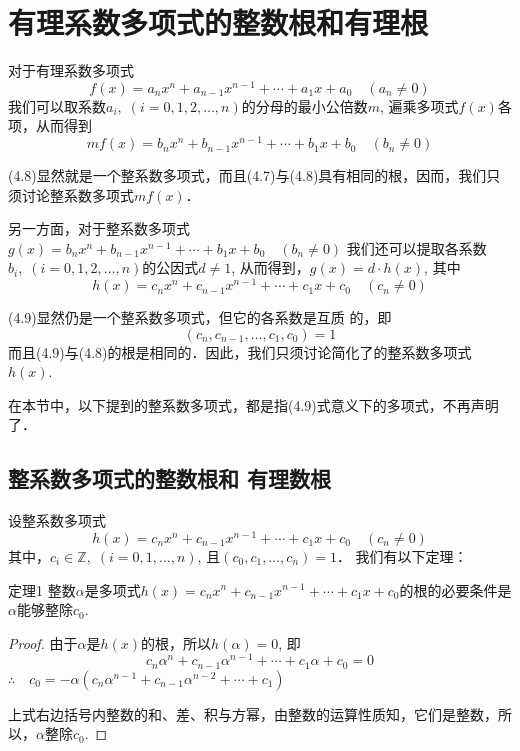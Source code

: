 \section{有理系数多项式的整数根和有理根}
对于有理系数多项式
\begin{equation}
    f(x)=a_nx^n+a_{n-1}x^{n-1}+\cdots+a_1x+a_0\quad (a_n\ne 0)
\end{equation}
我们可以取系数$a_i,\; (i=0, 1, 2,\ldots,n)$的分母的最小公倍数$m$, 遍乘多项式$f(x)$各项，从而得到
\begin{equation}
    mf(x)=b_nx^n+b_{n-1}x^{n-1}+\cdots+b_1x+b_0\quad (b_n\ne 0)
\end{equation}

(4.8)显然就是一个整系数多项式，而且(4.7)与(4.8)具有相同的根，因而，我们只须讨论整系数多项式$mf(x)$．

另一方面，对于整系数多项式$g (x) =b_nx^n+b_{n-1}x^{n-1}+\cdots+b_1x+b_0\quad (b_n\ne 0)$
我们还可以提取各系数$b_i,\; (i=0, 1, 2,\ldots,n)$的公因式$d\ne 1$, 从而得到，$g(x)=d\cdot h(x)$, 其中
\begin{equation}
    h (x) =c_nx^n+c_{n-1}x^{n-1}+\cdots+c_1x+c_0\quad (c_n\ne 0)
\end{equation}

(4.9)显然仍是一个整系数多项式，但它的各系数是互质
的，即$$(c_n,c_{n-1},\ldots,c_1,c_0)=1$$ 而且(4.9)与(4.8)的根是相同的．因此，我们只须讨论简化了的整系数多项式$h(x)$.

在本节中，以下提到的整系数多项式，都是指(4.9)式意义下的多项式，不再声明了．

\subsection{整系数多项式的整数根和 有理数根}

设整系数多项式
\[ h (x) =c_nx^n+c_{n-1}x^{n-1}+\cdots+c_1x+c_0\quad (c_n\ne 0)\]
其中，$c_i\in\mathbb{Z}, \;(i=0, 1,\ldots,n)$, 且$(c_0,c_1,\ldots,c_n)=1$．
我们有以下定理：

\begin{blk}{定理1}
    整数$\alpha$是多项式$h (x) =c_nx^n+c_{n-1}x^{n-1}+\cdots+c_1x+c_0$的根的必要条件是$\alpha$能够整除$c_0$.
\end{blk}

\begin{proof}
    由于$\alpha$是$h(x)$的根，所以$h(\alpha)=0$, 即
\[c_n\alpha^n+c_{n-1}\alpha^{n-1}+\cdots+c_1\alpha+c_0=0\]
$\therefore\quad c_0=-\alpha\left(c_n\alpha^{n-1}+c_{n-1}\alpha^{n-2}+\cdots+c_1\right)$

上式右边括号内整数的和、差、积与方幂，由整数的运算性质知，它们是整数，所以，$\alpha$整除$c_0$.
\end{proof}



